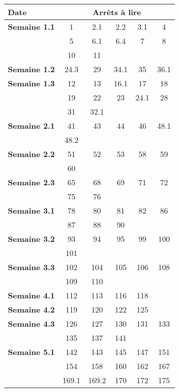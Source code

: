 \begin{table}[!htb]
\centering
\begin{tabularx}{0.8\textwidth}{l c c c c c}
\toprule
	\textbf{Date} & \multicolumn{5}{c}{\textbf{Arrêts à lire}} \\
\midrule
	\textbf{Semaine 1.1} \hspace{1cm} & 1 & 2.1 & 2.2 & 3.1 & 4 \\
	& 5 & 6.1 & 6.4 & 7 & 8 \\
	& 10 & 11 & & & \\ \midrule
	\textbf{Semaine 1.2} & 24.3 & 29 & 34.1 & 35 & 36.1 \\ \midrule
	\textbf{Semaine 1.3} & 12 & 13 & 16.1 & 17 & 18 \\ 
	& 19 & 22 & 23 & 24.1 & 28 \\ 
	& 31 & 32.1 & & & \\ \midrule
	\textbf{Semaine 2.1} & 41 & 43 & 44 & 46 & 48.1 \\ 
	& 48.2 & & & & \\ \midrule
	\textbf{Semaine 2.2} & 51 & 52 & 53 & 58 & 59 \\ 
	& 60 & & & & \\ \midrule
	\textbf{Semaine 2.3} & 65 & 68 & 69 & 71 & 72 \\ 
	& 75 & 76 & & & \\ \midrule
	\textbf{Semaine 3.1} & 78 & 80 & 81 & 82 & 86 \\ 
	& 87 & 88 & 90 & & \\ \midrule
	\textbf{Semaine 3.2 } & 93 & 94 & 95 & 99 & 100 \\ 
	& 101 & & & & \\ \midrule
	\textbf{Semaine 3.3} & 102 & 104 & 105 & 106 & 108 \\ 
	& 109 & 110 & & &\\ \midrule
	\textbf{Semaine 4.1} & 112 & 113 & 116 & 118 & \\ \midrule
	\textbf{Semaine 4.2} & 119 & 120 & 122 & 125 & \\ \midrule
	\textbf{Semaine 4.3} & 126 & 127 & 130 & 131 & 133 \\
	& 135 & 137 & 141 & & \\ \midrule
	\textbf{Semaine 5.1} & 142 & 143 & 145 & 147 & 151 \\
	& 154 & 158 & 160 & 162 & 167 \\
	& 169.1 & 169.2 & 170 & 172 & 175 \\ 
\bottomrule
\end{tabularx}
\end{table}
